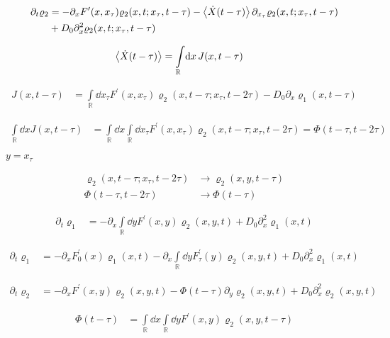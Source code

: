 \documentclass[a4paper,10pt]{article}
\newcommand{\intl}{\int\limits}
\begin{document}
\begin{align}
	\partial_t
	\varrho_2
	&=
	-
	\partial_x
	F^\prime(x,x_\tau)
	\varrho_2
	(x,t;x_\tau,t-\tau)
	-
	\expval{\dot{X}(t-\tau)}
	\partial_{x_\tau}
	\varrho_2
	(x,t;x_\tau,t-\tau)
	\\
	&+
	D_0
	\partial_x^2
	\varrho_2(x,t;x_\tau,t-\tau)
\end{align}

\begin{align}
	\expval{\dot{X}(t-\tau)}
	&=
	\intl_{\mathbb{R}}
	\!
	\dd{x}
	J(x,t-\tau)
\end{align}

\begin{align}
	J(x,t-\tau)
	&=
	\intl_{\mathbb{R}}
	\!
	\dd{x_\tau}
	F^\prime(x,x_\tau)
	\varrho_2
	(x,t-\tau;x_\tau,t-2\tau)
	-
	D_0
	\partial_x
	\varrho_1(x,t-\tau)
\end{align}

\begin{align}
	\intl_{\mathbb{R}}
	\!
	\dd{x}
	J(x,t-\tau)
	&=
	\intl_{\mathbb{R}}
	\!
	\dd{x}
	\intl_{\mathbb{R}}
	\!
	\dd{x_\tau}
	F^\prime(x,x_\tau)
	\varrho_2
	(x,t-\tau;x_\tau,t-2\tau)
	=
	\Phi(t-\tau,t-2\tau)
\end{align}


$y=x_\tau$

\begin{align}
	\varrho_2
	(x,t-\tau;x_\tau,t-2\tau)
	&\to
	\varrho_2
	(x,y,t-\tau)
\\
	\Phi(t-\tau,t-2\tau)
	&\to
	\Phi(t-\tau)
\end{align}

\begin{align}
	\partial_t
	\varrho_1
	&=
	-
	\partial_x
	\intl_{\mathbb{R}}
	\dd{y}
	F^\prime(x,y)
	\varrho_2
	(x,y,t)
	+
	D_0
	\partial_x^2
	\varrho_1
	(x,t)
\end{align}

\begin{align}
	\partial_t
	\varrho_1
	&=
	-
	\partial_x
	F_0^\prime(x)
	\varrho_1
	(x,t)
	-
	\partial_x
	\intl_{\mathbb{R}}
	\dd{y}
	F_\tau^\prime(y)
	\varrho_2
	(x,y,t)
	+
	D_0
	\partial_x^2
	\varrho_1
	(x,t)
\end{align}

\begin{align}
	\partial_t
	\varrho_2
	&=
	-
	\partial_x
	F^\prime(x,y)
	\varrho_2
	(x,y,t)
	-
	\Phi(t-\tau)
	\partial_{y}
	\varrho_2
	(x,y,t)
	+
	D_0
	\partial_x^2
	\varrho_2(x,y,t)
\end{align}

\begin{align}
	\Phi(t-\tau)
	&=
	\intl_{\mathbb{R}}
	\!
	\dd{x}
	\intl_{\mathbb{R}}
	\!
	\dd{y}
	F^\prime(x,y)
	\varrho_2
	(x,y,t-\tau)
\end{align}
\end{document}
